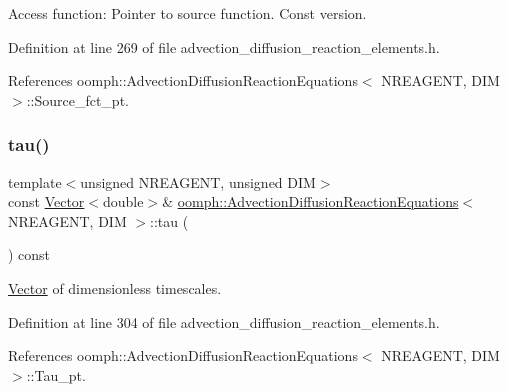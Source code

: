 Access function\+: Pointer to source function. Const version. 



Definition at line 269 of file advection\+\_\+diffusion\+\_\+reaction\+\_\+elements.\+h.



References oomph\+::\+Advection\+Diffusion\+Reaction\+Equations$<$ N\+R\+E\+A\+G\+E\+N\+T, D\+I\+M $>$\+::\+Source\+\_\+fct\+\_\+pt.

\mbox{\label{classoomph_1_1AdvectionDiffusionReactionEquations_a8976ed911125695578edfa5c2c23755b}} 
\subsubsection{\texorpdfstring{tau()}{tau()}}
{\footnotesize\ttfamily template$<$unsigned N\+R\+E\+A\+G\+E\+NT, unsigned D\+IM$>$ \\
const \hyperlink{classoomph_1_1Vector}{Vector}$<$double$>$\& \hyperlink{classoomph_1_1AdvectionDiffusionReactionEquations}{oomph\+::\+Advection\+Diffusion\+Reaction\+Equations}$<$ N\+R\+E\+A\+G\+E\+NT, D\+IM $>$\+::tau (\begin{DoxyParamCaption}{ }\end{DoxyParamCaption}) const\hspace{0.3cm}{\ttfamily [inline]}}



\hyperlink{classoomph_1_1Vector}{Vector} of dimensionless timescales. 



Definition at line 304 of file advection\+\_\+diffusion\+\_\+reaction\+\_\+elements.\+h.



References oomph\+::\+Advection\+Diffusion\+Reaction\+Equations$<$ N\+R\+E\+A\+G\+E\+N\+T, D\+I\+M $>$\+::\+Tau\+\_\+pt.

\mbox{\label{classoomph_1_1AdvectionDiffusionReactionEquations_ac3e7834f33607cc560e7a1dd08eb9b7a}} 
